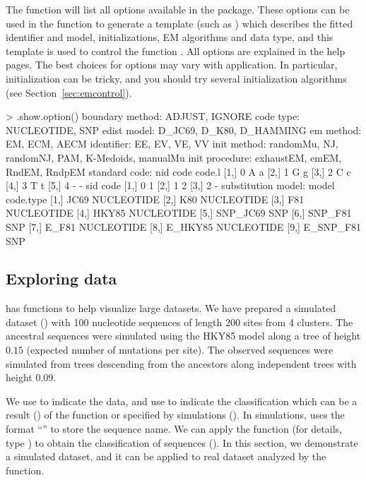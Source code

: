 The  function will list all options
available in the  package.
These options can be used in the  function
to generate a template (such as ) which describes
the fitted identifier and model, initializations, EM algorithms and
data type, and this template is used to control the function
. 
All options are explained in the help pages.
The best choices for options may vary with application.
In particular, initialization can be tricky, and you should try
several initialization algorithms (see Section~\ref{sec:emcontrol}).
\begin{Code}
> .show.option()
boundary method: ADJUST, IGNORE
code type: NUCLEOTIDE, SNP
edist model: D_JC69, D_K80, D_HAMMING
em method: EM, ECM, AECM
identifier: EE, EV, VE, VV
init method: randomMu, NJ, randomNJ, PAM, K-Medoids, manualMu
init procedure: exhaustEM, emEM, RndEM, RndpEM
standard code: 
     nid code code.l
[1,]   0    A      a
[2,]   1    G      g
[3,]   2    C      c
[4,]   3    T      t
[5,]   4    -      -
     sid code
[1,]   0    1
[2,]   1    2
[3,]   2    -
substitution model: 
          model  code.type
 [1,]      JC69 NUCLEOTIDE
 [2,]       K80 NUCLEOTIDE
 [3,]       F81 NUCLEOTIDE
 [4,]     HKY85 NUCLEOTIDE
 [5,]  SNP_JC69        SNP
 [6,]   SNP_F81        SNP
 [7,]     E_F81 NUCLEOTIDE
 [8,]   E_HKY85 NUCLEOTIDE
 [9,] E_SNP_F81        SNP
\end{Code}




\subsection[Exploring data]{Exploring data}
\label{sec:illustrate}

 has functions to help visualize large datasets.
We have prepared a simulated dataset () with 100 nucleotide sequences of length 200 sites from 4 clusters.
The ancestral sequences were simulated using the HKY85 model \citep{Hasegawa1985} along a tree of height $0.15$ (expected number of mutations per site).
The observed sequences were simulated from trees descending from the ancestors along independent trees with height $0.09$.

We use  to indicate the data,
and use  to indicate the classification which can be
{\color{red}
a result () of the  function
or specified by simulations ().}
In simulations,  uses
the format ``'' to store the sequence name.
We can apply the  function 
(for details, type ) to obtain
the classification of sequences ().
In this section, we demonstrate a simulated dataset,
and it can be applied to real dataset analyzed by the 
function.

